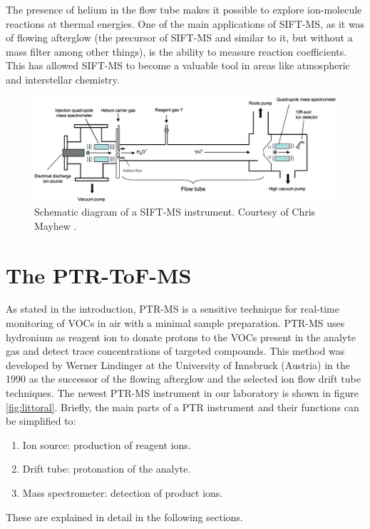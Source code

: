 The presence of helium in the flow tube makes it possible to explore ion-molecule reactions at thermal energies. One of the main applications of SIFT-MS, as it was of flowing afterglow (the precursor of SIFT-MS and similar to it, but without a mass filter among other things), is the ability to measure reaction coefficients. This has allowed SIFT-MS to become a valuable tool in areas like atmospheric and interstellar chemistry.

\begin{figure}%
\centering
    \includegraphics[width=0.8\linewidth]{pics/sift.png}
    \caption{Schematic diagram of a SIFT-MS instrument. Courtesy of Chris Mayhew \cite{ellis2013proton}.}
    \label{fig:sift}
\end{figure}



\section{The PTR-ToF-MS}
As stated in the introduction, PTR-MS is a sensitive technique for real-time monitoring of VOCs in air with a minimal sample preparation. PTR-MS uses hydronium as reagent ion to donate protons to the VOCs present in the analyte gas and detect trace concentrations of targeted compounds. This method was developed by Werner Lindinger at the University of Innsbruck (Austria) in the 1990 \cite{RN601} as the successor of the flowing afterglow  and the selected ion flow drift tube techniques. The newest PTR-MS instrument in our laboratory is shown in figure \ref{fig:littoral}. %
Briefly, the main  parts of a PTR instrument and their functions can be simplified to:
\begin{enumerate}
    \item Ion source: production of reagent ions.
    \item Drift tube:  protonation of the analyte.
    \item Mass spectrometer: detection of product ions.
\end{enumerate}
  These are explained in detail in the following sections.

